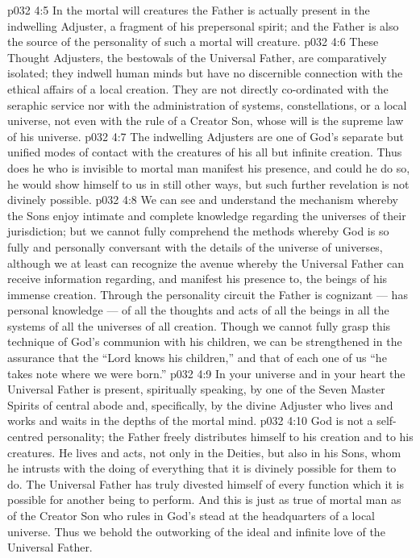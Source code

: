 \vs p032 4:5 \pc In the mortal will creatures the Father is actually present in the indwelling Adjuster, a fragment of his prepersonal spirit; and the Father is also the source of the personality of such a mortal will creature.
\vs p032 4:6 \pc These Thought Adjusters, the bestowals of the Universal Father, are comparatively isolated; they indwell human minds but have no discernible connection with the ethical affairs of a local creation. They are not directly co\hyp{}ordinated with the seraphic service nor with the administration of systems, constellations, or a local universe, not even with the rule of a Creator Son, whose will is the supreme law of his universe.
\vs p032 4:7 The indwelling Adjusters are one of God’s separate but unified modes of contact with the creatures of his all but infinite creation. Thus does he who is invisible to mortal man manifest his presence, and could he do so, he would show himself to us in still other ways, but such further revelation is not divinely possible.
\vs p032 4:8 We can see and understand the mechanism whereby the Sons enjoy intimate and complete knowledge regarding the universes of their jurisdiction; but we cannot fully comprehend the methods whereby God is so fully and personally conversant with the details of the universe of universes, although we at least can recognize the avenue whereby the Universal Father can receive information regarding, and manifest his presence to, the beings of his immense creation. Through the personality circuit the Father is cognizant --- has personal knowledge --- of all the thoughts and acts of all the beings in all the systems of all the universes of all creation. Though we cannot fully grasp this technique of God’s communion with his children, we can be strengthened in the assurance that the “Lord knows his children,” and that of each one of us “he takes note where we were born.”
\vs p032 4:9 \pc In your universe and in your heart the Universal Father is present, spiritually speaking, by one of the Seven Master Spirits of central abode and, specifically, by the divine Adjuster who lives and works and waits in the depths of the mortal mind.
\vs p032 4:10 \pc God is not a self\hyp{}centred personality; the Father freely distributes himself to his creation and to his creatures. He lives and acts, not only in the Deities, but also in his Sons, whom he intrusts with the doing of everything that it is divinely possible for them to do. The Universal Father has truly divested himself of every function which it is possible for another being to perform. And this is just as true of mortal man as of the Creator Son who rules in God’s stead at the headquarters of a local universe. Thus we behold the outworking of the ideal and infinite love of the Universal Father.
